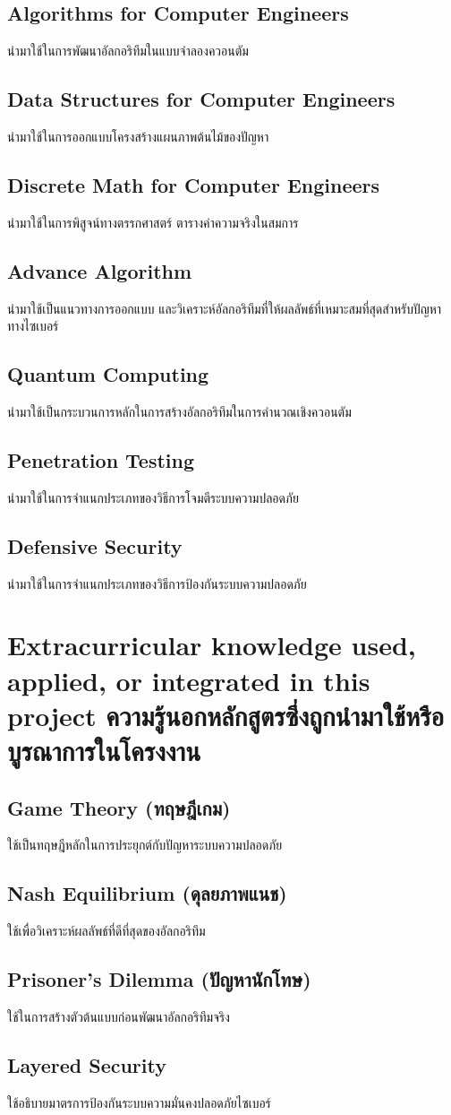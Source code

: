 \subsection{Algorithms for Computer Engineers} นํามาใช้ในการพัฒนาอัลกอริทึมในแบบจำลองควอนตัม
\subsection{Data Structures for Computer Engineers} นํามาใช้ในการออกแบบโครงสร้างแผนภาพต้นไม้ของปัญหา
\subsection{Discrete Math for Computer Engineers} นํามาใช้ในการพิสูจน์ทางตรรกศาสตร์ ตารางค่าความจริงในสมการ
\subsection{Advance Algorithm} นํามาใช้เป็นแนวทางการออกแบบ และวิเคราะห์อัลกอริทึมที่ให้ผลลัพธ์ที่เหมาะสมที่สุดสำหรับปัญหาทางไซเบอร์
\subsection{Quantum Computing} นำมาใช้เป็นกระบวนการหลักในการสร้างอัลกอริทึมในการคำนวณเชิงควอนตัม
\subsection{Penetration Testing} นำมาใช้ในการจำแนกประเภทของวิธีการโจมตีระบบความปลอดภัย
\subsection{Defensive Security} นำมาใช้ในการจำแนกประเภทของวิธีการป้องกันระบบความปลอดภัย

\section{\ifenglish%
Extracurricular knowledge used, applied, or integrated in this project
\else%
ความรู้นอกหลักสูตรซึ่งถูกนำมาใช้หรือบูรณาการในโครงงาน
\fi
}
\subsection{Game Theory (ทฤษฎีเกม)} ใช้เป็นทฤษฎีหลักในการประยุกต์กับปัญหาระบบความปลอดภัย
\subsection{Nash Equilibrium (ดุลยภาพแนช)} ใช้เพื่อวิเคราะห์ผลลัพธ์ที่ดีที่สุดของอัลกอริทึม
\subsection{Prisoner’s Dilemma (ปัญหานักโทษ)} ใช้ในการสร้างตัวต้นแบบก่อนพัฒนาอัลกอริทึมจริง
\subsection{Layered Security} ใช้อธิบายมาตรการป้องกันระบบความมั่นคงปลอดภัยไซเบอร์
